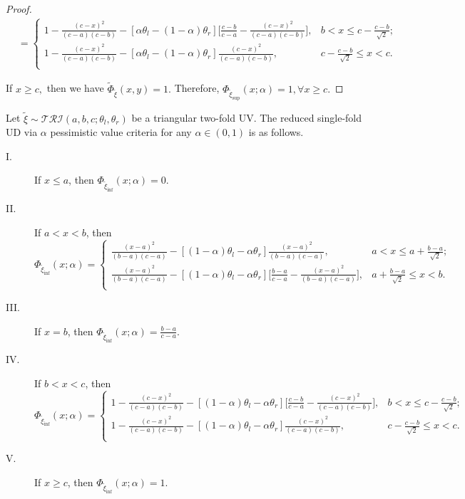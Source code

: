 \begin{proof}
\begin{equation*}
\begin{aligned}
		& =\left\{
		\begin{array}{ll}
			1-\frac{(c-x)^2}{(c-a)(c-b)}-[\alpha\theta_l-(1-\alpha)\theta_r]\big[\frac{c-b}{c-a}-\frac{(c-x)^2}{(c-a)(c-b)}\big], & b<x\leq c-\frac{c-b}{\sqrt{2}};\\
			1-\frac{(c-x)^2}{(c-a)(c-b)}-[\alpha\theta_l-(1-\alpha)\theta_r]\frac{(c-x)^2}{(c-a)(c-b)}, &  c-\frac{c-b}{\sqrt{2}}\leq x<c.\\
		\end{array}
		\right.
	\end{aligned}
\end{equation*}
\par 	If $x\geq c,$ then we have $\tilde{\Phi}_{\tilde{\xi}}(x,y)=1.$ Therefore, $\Phi_{\tilde{\xi}_{\sup}}(x;\alpha)=1, \forall x\geq c.$
\end{proof}
\begin{theorem}\label{thm.7}
	Let $\tilde{\xi}\sim \mathcal{TRI}(a,b,c;\theta_l,\theta_r)$ be a triangular two-fold UV. The reduced single-fold UD via $\alpha$ pessimistic value criteria for any $\alpha \in(0,1)$ is as follows.
	\begin{description}
		\item[ I.] If $x\leq a$, then $\Phi_{\tilde{\xi}_{\inf}}(x;\alpha)=0.$  
		\item[ II.] If $a< x< b$, then
		\[\Phi_{\tilde{\xi}_{\inf}}(x;\alpha)=\left\{
		\begin{array}{ll}
			\frac{(x-a)^2}{(b-a)(c-a)}-[(1-\alpha)\theta_l-\alpha\theta_r]\frac{(x-a)^2}{(b-a)(c-a)}, & a<x\leq a+\frac{b-a}{\sqrt{2}};\\
			\frac{(x-a)^2}{(b-a)(c-a)}-[(1-\alpha)\theta_l-\alpha\theta_r]\big[\frac{b-a}{c-a}-\frac{(x-a)^2}{(b-a)(c-a)}\big], & a+\frac{b-a}{\sqrt{2}}\leq x<b.\\
		\end{array}
		\right.
		\]
		\item[ III.]  If $x=b$, then $\Phi_{\tilde{\xi}_{\inf}}(x;\alpha)=\frac{b-a}{c-a}.$ 
		\item[ IV.] If $b<x< c$, then  
		\[\Phi_{\tilde{\xi}_{\inf}}(x;\alpha)=\left\{
		\begin{array}{ll}
			1-\frac{(c-x)^2}{(c-a)(c-b)}-[(1-\alpha)\theta_l-\alpha\theta_r]\big[\frac{c-b}{c-a}-\frac{(c-x)^2}{(c-a)(c-b)}\big], & b<x\leq c-\frac{c-b}{\sqrt{2}};\\
			1-\frac{(c-x)^2}{(c-a)(c-b)}-[(1-\alpha)\theta_l-\alpha\theta_r]\frac{(c-x)^2}{(c-a)(c-b)}, &  c-\frac{c-b}{\sqrt{2}}\leq x<c.\\
		\end{array}
		\right.
		\] 
		\item[ V.] If $x\geq c$, then  $\Phi_{\tilde{\xi}_{\inf}}(x;\alpha)=1.$ 
	\end{description}
\end{theorem}
